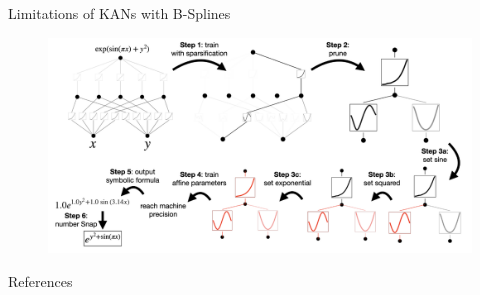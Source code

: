 \documentclass[aspectratio=169]{beamer}
\begin{document}
\begin{frame}{Limitations of KANs with B-Splines}
	
	\begin{figure}
		\centering
		\includegraphics[height=0.8\textheight]{../images/kan_training.png}
	\end{figure}
	
\end{frame}


\begin{frame}{References}
	\nocite{liu_kan_2025}
	\nocite{pal_understanding_nodate}
	\printbibliography[heading=none]
\end{frame}
\end{document}
